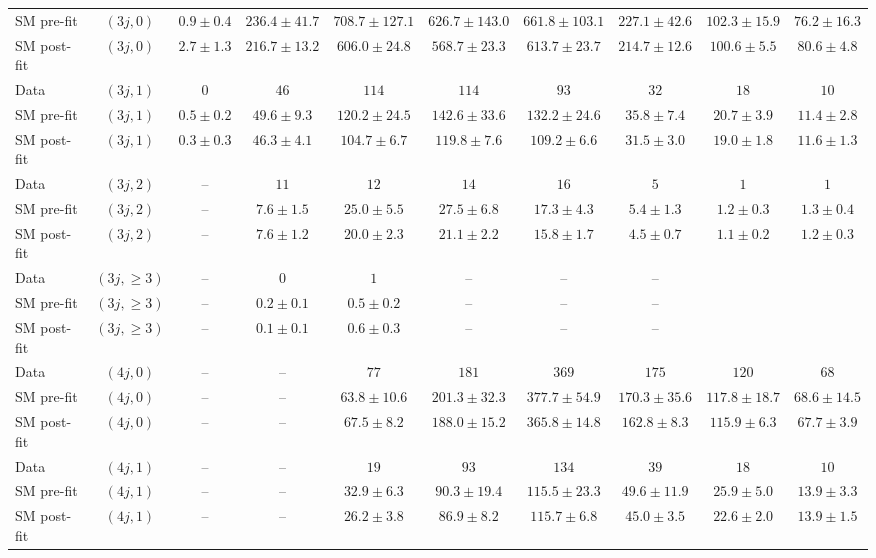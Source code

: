 {\begin{table}[h!]
{\begin{tabular}{lccccccccc}
 SM pre-fit & $(3j,0)$ & $0.9\pm0.4$ & $236.4\pm41.7$ & $708.7\pm127.1$ & $626.7\pm143.0$ & $661.8\pm103.1$ & $227.1\pm42.6$ & $102.3\pm15.9$ & $76.2\pm16.3$ \\[0.5ex]
 SM post-fit & $(3j,0)$ & $2.7\pm1.3$ & $216.7\pm13.2$ & $606.0\pm24.8$ & $568.7\pm23.3$ & $613.7\pm23.7$ & $214.7\pm12.6$ & $100.6\pm5.5$ & $80.6\pm4.8$ \\[0.5ex]
 Data & $(3j,1)$ & $0$ & $46$ & $114$ & $114$ & $93$ & $32$ & $18$ & $10$ \\[0.5ex]
 SM pre-fit & $(3j,1)$ & $0.5\pm0.2$ & $49.6\pm9.3$ & $120.2\pm24.5$ & $142.6\pm33.6$ & $132.2\pm24.6$ & $35.8\pm7.4$ & $20.7\pm3.9$ & $11.4\pm2.8$ \\[0.5ex]
 SM post-fit & $(3j,1)$ & $0.3\pm0.3$ & $46.3\pm4.1$ & $104.7\pm6.7$ & $119.8\pm7.6$ & $109.2\pm6.6$ & $31.5\pm3.0$ & $19.0\pm1.8$ & $11.6\pm1.3$ \\[0.5ex]
 Data & $(3j,2)$ & -- & $11$ & $12$ & $14$ & $16$ & $5$ & $1$ & $1$ \\[0.5ex]
 SM pre-fit & $(3j,2)$ & -- & $7.6\pm1.5$ & $25.0\pm5.5$ & $27.5\pm6.8$ & $17.3\pm4.3$ & $5.4\pm1.3$ & $1.2\pm0.3$ & $1.3\pm0.4$ \\[0.5ex]
 SM post-fit & $(3j,2)$ & -- & $7.6\pm1.2$ & $20.0\pm2.3$ & $21.1\pm2.2$ & $15.8\pm1.7$ & $4.5\pm0.7$ & $1.1\pm0.2$ & $1.2\pm0.3$ \\[0.5ex]
 Data & $(3j,\geq 3)$ & -- & $0$ & $1$ & -- & -- & -- \\[0.5ex]
 SM pre-fit & $(3j,\geq 3)$ & -- & $0.2\pm0.1$ & $0.5\pm0.2$ & -- & -- & -- \\[0.5ex]
 SM post-fit & $(3j,\geq 3)$ & -- & $0.1\pm0.1$ & $0.6\pm0.3$ & -- & -- & -- \\[0.5ex]
 Data & $(4j,0)$ & -- & -- & $77$ & $181$ & $369$ & $175$ & $120$ & $68$ \\[0.5ex]
 SM pre-fit & $(4j,0)$ & -- & -- & $63.8\pm10.6$ & $201.3\pm32.3$ & $377.7\pm54.9$ & $170.3\pm35.6$ & $117.8\pm18.7$ & $68.6\pm14.5$ \\[0.5ex]
 SM post-fit & $(4j,0)$ & -- & -- & $67.5\pm8.2$ & $188.0\pm15.2$ & $365.8\pm14.8$ & $162.8\pm8.3$ & $115.9\pm6.3$ & $67.7\pm3.9$ \\[0.5ex]
 Data & $(4j,1)$ & -- & -- & $19$ & $93$ & $134$ & $39$ & $18$ & $10$ \\[0.5ex]
 SM pre-fit & $(4j,1)$ & -- & -- & $32.9\pm6.3$ & $90.3\pm19.4$ & $115.5\pm23.3$ & $49.6\pm11.9$ & $25.9\pm5.0$ & $13.9\pm3.3$ \\[0.5ex]
 SM post-fit & $(4j,1)$ & -- & -- & $26.2\pm3.8$ & $86.9\pm8.2$ & $115.7\pm6.8$ & $45.0\pm3.5$ & $22.6\pm2.0$ & $13.9\pm1.5$ \\[0.5ex]

\end{tabular}}
\end{table}}
